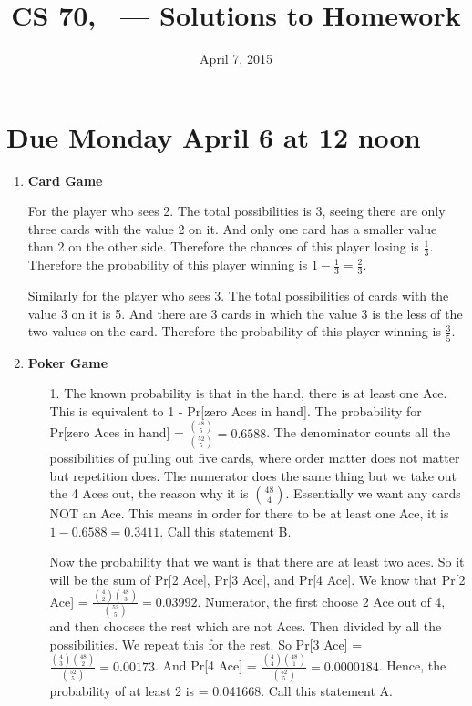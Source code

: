 \documentclass[12pt,fleqn]{article}
\title{CS 70, \Session\ --- Solutions to Homework \Homework}
\date{April 7, 2015}
\begin{document}
\maketitle

\section*{Due Monday April 6 at 12 noon}



\begin{enumerate}
  \item \textbf{Card Game}
  
	For the player who sees 2. The total possibilities is 3, seeing there are only three cards with the value 2 on it. And only one card has a smaller value than 2 on the other side. Therefore the chances of this player losing is $\frac{1}{3}$. Therefore the probability of this player winning is $1 - \frac{1}{3} = \frac{2}{3}$.
	
	Similarly for the player who sees 3. The total possibilities of cards with the value 3 on it is 5. And there are 3 cards in which the value 3 is the less of the two values on the card. Therefore the probability of this player winning is $\frac{3}{5}$.
    
  
  \newpage
  \item \textbf{Poker Game}

  \begin{enumerate}
  	\item[1.] The known probability is that in the hand, there is at least one Ace. This is equivalent to 1 - Pr[zero Aces in hand]. The probability for Pr[zero Aces in hand] = $\frac{{48 \choose 5}}{{52 \choose 5}} = 0.6588$. The denominator counts all the possibilities of pulling out five cards, where order matter does not matter but repetition does. The numerator does the same thing but we take out the 4 Aces out, the reason why it is ${48 \choose 4}$. Essentially we want any cards NOT an Ace. This means in order for there to be at least one Ace, it is $1 - 0.6588 = 0.3411$. Call this statement B.
  	
  	Now the probability that we want is that there are at least two aces. So it will be the sum of Pr[2 Ace], Pr[3 Ace], and Pr[4 Ace]. We know that Pr[2 Ace] = $\frac{{4 \choose 2}{48 \choose 3}}{{52 \choose 5}} = 0.03992$. Numerator, the first choose 2 Ace out of 4, and then chooses the rest which are not Aces. Then divided by all the possibilities. We repeat this for the rest. So Pr[3 Ace] = $\frac{{4 \choose 3}{48 \choose 2}}{{52 \choose 5}} = 0.00173$. And Pr[4 Ace] = $\frac{{4 \choose 4}{48 \choose 1}}{{52 \choose 5}} = 0.0000184$. Hence, the probability of at least 2 is = 0.041668. Call this statement A. 
  	

\end{enumerate}
\end{enumerate}
\end{document}
